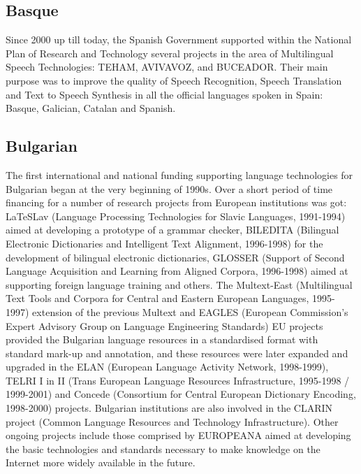 \documentclass[10pt, plain]{../../metanetpaper}
\begin{document}
\label{european-funding-situation}



\begin{multicols}{2}

\subsection*{Basque}
\label{sec:basque}

Since 2000 up till today, the Spanish Government supported within the National Plan of Research and Technology several projects in the area of Multilingual Speech Technologies: TEHAM, AVIVAVOZ, and BUCEADOR. Their main purpose was to improve the quality of Speech Recognition, Speech Translation and Text to Speech Synthesis in all the official languages spoken in Spain: Basque, Galician, Catalan and Spanish.

\subsection*{Bulgarian}
\label{sec:bulgarian}

The first international and national funding supporting language technologies for Bulgarian began at the very beginning of 1990s. Over a short period of time financing for a number of research projects from European institutions was got: LaTeSLav (Language Processing Technologies for Slavic Languages, 1991-1994) aimed at developing a prototype of a grammar checker, BILEDITA (Bilingual Electronic Dictionaries and Intelligent Text Alignment, 1996-1998) for the development of bilingual electronic dictionaries, GLOSSER (Support of Second Language Acquisition and Learning from Aligned Corpora, 1996-1998) aimed at supporting foreign language training and others. The Multext-East (Multilingual Text Tools and Corpora for Central and Eastern European Languages, 1995-1997) extension of the previous Multext and EAGLES (European Commission’s Expert Advisory Group on Language Engineering Standards) EU projects provided the Bulgarian language resources in a standardised format with standard mark-up and annotation, and these resources were later expanded and upgraded in the ELAN (European Language Activity Network, 1998-1999), TELRI I in II (Trans European Language Resources Infrastructure, 1995-1998 / 1999-2001) and Concede (Consortium for Central European Dictionary Encoding, 1998-2000) projects. Bulgarian institutions are also involved in the CLARIN project (Common Language Resources and Technology Infrastructure). Other ongoing projects include those comprised by EUROPEANA aimed at developing the basic technologies and standards necessary to make knowledge on the Internet more widely available in the future.


\end{multicols}
\end{document}
